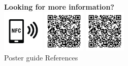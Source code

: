\documentclass[a0paper,portrait]{baposter}
\begin{document}
\begin{poster}
{\vspace{3em}
\begin{flushright}
	\begin{minipage}{0.75\textwidth}
			\textbf{Looking for more information?}\\
			\includegraphics[width=2cm]{figures/nfc_logo.png} %
			\includegraphics[width=2cm]{figures/qr_code_references.jpg} %
			\includegraphics[width=2cm]{figures/qr_code_references.jpg} \\
			\phantom{x} \hspace{2em} Poster guide \hspace{3em} References
	\end{minipage}
\end{flushright}

}








\end{poster}
\end{document}
